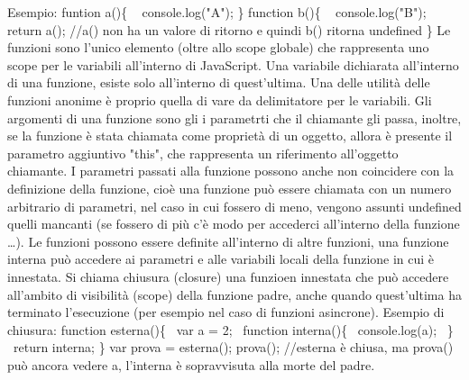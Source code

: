 Esempio:\newline
funtion a()\{\newline
\ \;\;\;\; console.log("A");\newline
\}\newline
function b()\{\newline
\ \;\;\;\;    console.log("B");\newline
\ \;\;\;\;    return a(); //a() non ha un valore di ritorno e quindi b() ritorna undefined\newline
\}\newline
\newline
Le funzioni sono l'unico elemento (oltre allo scope globale) che rappresenta uno scope per le variabili all'interno di JavaScript. Una variabile dichiarata all'interno di una funzione, esiste solo all'interno di quest'ultima.\newline
Una delle utilità delle funzioni anonime è proprio quella di vare da delimitatore per le variabili.\newline
\newline
Gli argomenti di una funzione sono gli i parametrti che il chiamante gli passa, inoltre, se la funzione è stata chiamata come proprietà di un oggetto, allora è presente il parametro aggiuntivo "this", che rappresenta un riferimento all'oggetto chiamante.\newline
I parametri passati alla funzione possono anche non coincidere con la definizione della funzione, cioè una funzione può essere chiamata con un numero arbitrario di parametri, nel caso in cui fossero di meno, vengono assunti undefined quelli mancanti (se fossero di più c'è modo per accederci all'interno della funzione \dots).\newline
\newline
Le funzioni possono essere definite all'interno di altre funzioni, una funzione interna può accedere ai parametri e alle variabili locali della funzione in cui è innestata.\newline
Si chiama chiusura (closure) una funzioen innestata che può accedere all'ambito di visibilità (scope) della funzione padre, anche quando quest'ultima ha terminato l'esecuzione (per esempio nel caso di funzioni asincrone).\newline
Esempio di chiusura:\newline
function esterna()\{\newline
\ \;\;\;\;var a = 2;\newline
\ \;\;\;\;function interna()\{\newline
\ \;\;\;\;\;\;\;\;console.log(a);\newline
\ \;\;\;\;\}\newline
\ \;\;\;\;return interna;
\}\newline
var prova = esterna();\newline
prova(); //esterna è chiusa, ma prova() può ancora vedere a, l'interna è sopravvisuta alla morte del padre.\newline
